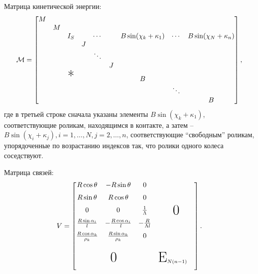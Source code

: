 Матрица кинетической энергии:
$$
\M = \begin{bmatrix}
    M &   &               &   &        &   &                        &        &                        \\
      & M &               &   &        &   &                        &        &                        \\
      &   & I_S           &   & \cdots &   & B\sin(\chi_k+\kappa_1) & \cdots & B\sin(\chi_N+\kappa_n) \\
      &   &               & J &        &   &                        &        &                        \\
      &   &               &   & \ddots &   &                        &        &                        \\
      &   &               &   &        & J &                        &        &                        \\
      &   & \text{\huge*} &   &        &   & B                      &        &                        \\
      &   &               &   &        &   &                        & \ddots &                        \\
      &   &               &   &        &   &                        &        & B                      \\
\end{bmatrix},
$$
где в третьей строке сначала указаны элементы $B\sin(\chi_k + \kappa_1)$, соответствующие роликам, находящимся в контакте, а затем -- $B\sin(\chi_i + \kappa_j), i = 1,\ldots,N, j = 2,\ldots,n$, соответствующие ``свободным'' роликам, упорядоченные по возрастанию индексов так, что ролики одного колеса соседствуют.

Матрица связей:
$$
V = \begin{bmatrix}
    \begin{matrix}
        R\cos\theta                  & -R\sin\theta                  & 0                    \\[6pt]
        R\sin\theta                  &  R\cos\theta                  & 0                    \\[6pt]
        0                            & 0                             & \frac{1}{\Lambda}    \\[6pt]
        \frac{R\sin\alpha_i}{l}      & -\frac{R\cos\alpha_i}{l}      & -\frac{R}{\Lambda l} \\[6pt]
        \frac{R\cos\alpha_k}{\rho_k} &  \frac{R\sin\alpha_k}{\rho_k} & 0                    \\[6pt]
    \end{matrix}   & \text{\huge 0}                \\[50pt]
    \text{\huge 0} & \text{\huge E}_{N(n-1)} \quad \\[10pt]
\end{bmatrix}.
$$

